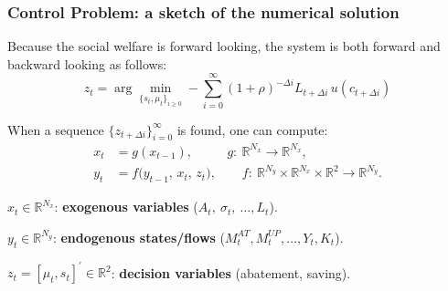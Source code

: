 \documentclass[xcolor=x11names,compress,aspectratio=169]{beamer}%
\makeatletter
\renewenvironment{itemize}{\begin{compactitemize}[<+-| alert@+>]}{\end{compactitemize}}
\makeatother
\begin{document}
\begin{frame}%
%

\frametitle{Control Problem: a sketch of the numerical solution}%


\begin{itemize}
\item Because the social welfare is forward looking, the system is both
forward and backward looking as follows:%
\[
z_{t}=\arg\min_{\{s_{t},\mu_{t}\}_{i\geq0}}-\sum_{i=0}^{\infty}(1+\rho
)^{-\Delta i}L_{t+\Delta i}\,u(c_{t+\Delta i})
\]


\item When a sequence $\{z_{t+\Delta i}\}_{i=0}^{\infty}$ is found, one can
compute:
\begin{align*}
x_{t}  &  =g(x_{t-1}),\qquad\text{\ \ \ \ \ \ \ \ \ }g:\ \mathbb{R}^{N_{x}%
}\rightarrow\mathbb{R}^{N_{x}},\\[0.3em]
y_{t}  &  =f\big(y_{t-1},\,x_{t},\,z_{t}\big),\qquad f:\ \mathbb{R}^{N_{y}%
}\times\mathbb{R}^{N_{x}}\times\mathbb{R}^{2}\rightarrow\mathbb{R}^{N_{y}}.
\end{align*}


\item $x_{t}\in\mathbb{R}^{N_{x}}$: \textbf{exogenous variables}
($A_{t},\ \sigma_{t},\ \ldots,L_{t}$).

\item $y_{t}\in\mathbb{R}^{N_{y}}$: \textbf{endogenous states/flows}
($M_{t}^{AT},M_{t}^{UP},\ldots,Y_{t},K_{t}$).

\item $z_{t}=[\mu_{t},s_{t}]^{\prime}\in\mathbb{R}^{2}$: \textbf{decision
variables} (abatement, saving).
\end{itemize}

%

\transboxout
\end{frame}%
%
\end{document}
